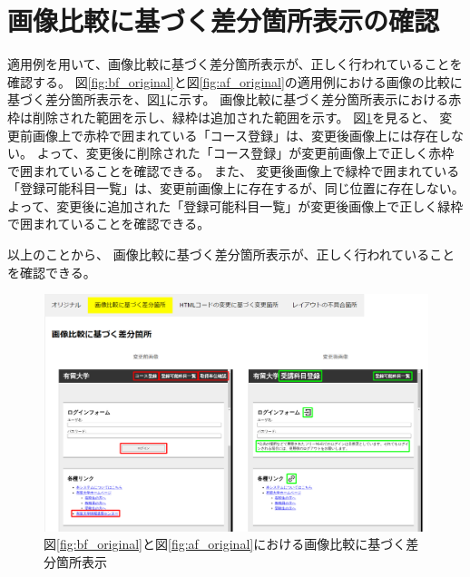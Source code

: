 \section{画像比較に基づく差分箇所表示の確認}
適用例を用いて、画像比較に基づく差分箇所表示が、正しく行われていることを確認する。
図\ref{fig:bf_original}と図\ref{fig:af_original}の適用例における画像の比較に基づく差分箇所表示を、図\ref{fig: 5_app2}に示す。
画像比較に基づく差分箇所表示における赤枠は削除された範囲を示し、緑枠は追加された範囲を示す。
図\ref{fig: 5_app2}を見ると、
変更前画像上で赤枠で囲まれている「コース登録」は、変更後画像上には存在しない。
よって、変更後に削除された「コース登録」が変更前画像上で正しく赤枠で囲まれていることを確認できる。
また、
変更後画像上で緑枠で囲まれている「登録可能科目一覧」は、変更前画像上に存在するが、同じ位置に存在しない。
よって、変更後に追加された「登録可能科目一覧」が変更後画像上で正しく緑枠で囲まれていることを確認できる。
\par
以上のことから、
画像比較に基づく差分箇所表示が、正しく行われていることを確認できる。
\begin{figure}[tp]
    \begin{center}
        \includegraphics[width=1.0\columnwidth]{image/5/new_img.png}
        \caption{図\ref{fig:bf_original}と図\ref{fig:af_original}における画像比較に基づく差分箇所表示}
        \label{fig: 5_app2}
    \end{center}
\end{figure}



